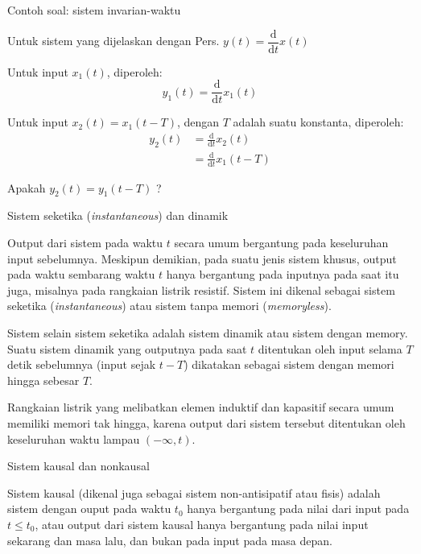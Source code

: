 \begin{frame}{Contoh soal: sistem invarian-waktu}

Untuk sistem yang dijelaskan dengan Pers. $y(t) = \dfrac{\mathrm{d}}{\mathrm{d}t} x(t)$

Untuk input $x_{1}(t)$, diperoleh:
\begin{equation*}
y_{1}(t) = \frac{\mathrm{d}}{\mathrm{d}t} x_{1}(t)
\end{equation*}

Untuk input $x_{2}(t) = x_{1}(t - T)$, dengan $T$ adalah suatu konstanta, diperoleh:
\begin{align*}
y_{2}(t) & = \frac{\mathrm{d}}{\mathrm{d}t} x_{2}(t) \\
         & = \frac{\mathrm{d}}{\mathrm{d}t} x_{1}(t-T)
\end{align*}

Apakah $y_{2}(t) = y_{1}(t-T)$ ?

\end{frame}


\begin{frame}{Sistem seketika (\textit{instantaneous}) dan dinamik}

Output dari sistem pada waktu $t$ secara umum bergantung pada keseluruhan input
sebelumnya. Meskipun demikian, pada suatu jenis sistem khusus, output pada
waktu sembarang waktu $t$ hanya bergantung pada inputnya pada saat itu juga,
misalnya pada rangkaian listrik resistif.
Sistem ini dikenal sebagai sistem seketika (\textit{instantaneous})
atau sistem tanpa memori (\textit{memoryless}).

Sistem selain sistem seketika adalah sistem dinamik atau sistem dengan memory.
Suatu sistem dinamik yang outputnya pada saat $t$ ditentukan oleh input selama
$T$ detik sebelumnya (input sejak $t-T$) dikatakan sebagai sistem dengan
memori hingga sebesar $T$.

Rangkaian listrik yang melibatkan elemen induktif dan kapasitif secara umum
memiliki memori tak hingga, karena output dari sistem tersebut ditentukan
oleh keseluruhan waktu lampau $(-\infty,t)$.

\end{frame}


\begin{frame}{Sistem kausal dan nonkausal}

Sistem kausal (dikenal juga sebagai sistem non-antisipatif atau fisis) adalah
sistem dengan ouput pada waktu $t_0$ hanya bergantung pada nilai dari input
pada $t \leq t_0$, atau output dari sistem kausal hanya bergantung pada nilai
input sekarang dan masa lalu, dan bukan pada input pada masa depan.
  
\end{frame}



